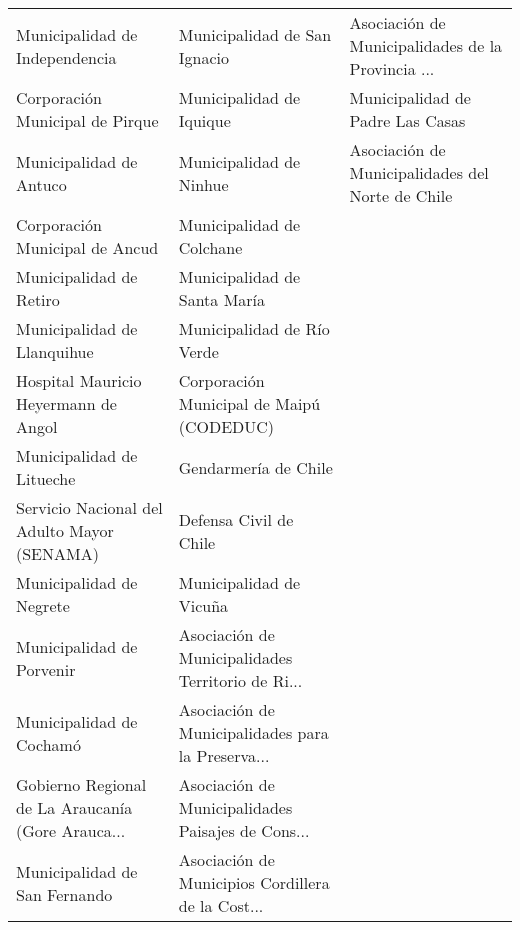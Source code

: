 \documentclass[11pt]{article}
\begin{document}
\begin{tabular}{ p{5cm} | p{5cm} | p{5cm} }
                    Municipalidad de Independencia &                       Municipalidad de San Ignacio &  Asociación de Municipalidades de la Provincia ... \\
                   Corporación Municipal de Pirque &                           Municipalidad de Iquique &                   Municipalidad de Padre Las Casas \\
                           Municipalidad de Antuco &                            Municipalidad de Ninhue &   Asociación de Municipalidades del Norte de Chile \\
                    Corporación Municipal de Ancud &                          Municipalidad de Colchane &                                                    \\
                           Municipalidad de Retiro &                       Municipalidad de Santa María &                                                    \\
                       Municipalidad de Llanquihue &                         Municipalidad de Río Verde &                                                    \\
              Hospital Mauricio Heyermann de Angol &           Corporación Municipal de Maipú (CODEDUC) &                                                    \\
                         Municipalidad de Litueche &                               Gendarmería de Chile &                                                    \\
       Servicio Nacional del Adulto Mayor (SENAMA) &                             Defensa Civil de Chile &                                                    \\
                          Municipalidad de Negrete &                            Municipalidad de Vicuña &                                                    \\
                         Municipalidad de Porvenir &  Asociación de Municipalidades Territorio de Ri... &                                                    \\
                          Municipalidad de Cochamó &  Asociación de Municipalidades para la Preserva... &                                                    \\
 Gobierno Regional de La Araucanía (Gore Arauca... &  Asociación de Municipalidades Paisajes de Cons... &                                                    \\
                     Municipalidad de San Fernando &  Asociación de Municipios Cordillera de la Cost... &                                                    \\
\bottomrule
\end{tabular}
\end{document}
